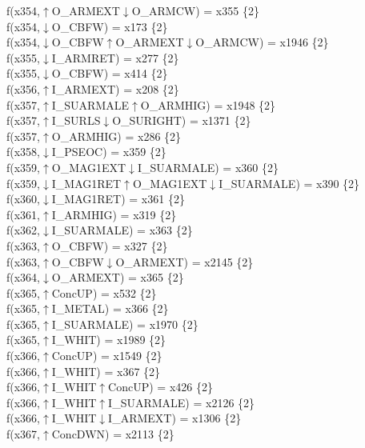 f(x354,$\uparrow$O\_ARMEXT$\downarrow$O\_ARMCW) = x355 \{2\} \\  
f(x354,$\downarrow$O\_CBFW) = x173 \{2\} \\  
f(x354,$\downarrow$O\_CBFW$\uparrow$O\_ARMEXT$\downarrow$O\_ARMCW) = x1946 \{2\} \\  
f(x355,$\downarrow$I\_ARMRET) = x277 \{2\} \\  
f(x355,$\downarrow$O\_CBFW) = x414 \{2\} \\  
f(x356,$\uparrow$I\_ARMEXT) = x208 \{2\} \\  
f(x357,$\uparrow$I\_SUARMALE$\uparrow$O\_ARMHIG) = x1948 \{2\} \\  
f(x357,$\uparrow$I\_SURLS$\downarrow$O\_SURIGHT) = x1371 \{2\} \\  
f(x357,$\uparrow$O\_ARMHIG) = x286 \{2\} \\  
f(x358,$\downarrow$I\_PSEOC) = x359 \{2\} \\  
f(x359,$\uparrow$O\_MAG1EXT$\downarrow$I\_SUARMALE) = x360 \{2\} \\  
f(x359,$\downarrow$I\_MAG1RET$\uparrow$O\_MAG1EXT$\downarrow$I\_SUARMALE) = x390 \{2\} \\  
f(x360,$\downarrow$I\_MAG1RET) = x361 \{2\} \\  
f(x361,$\uparrow$I\_ARMHIG) = x319 \{2\} \\  
f(x362,$\downarrow$I\_SUARMALE) = x363 \{2\} \\  
f(x363,$\uparrow$O\_CBFW) = x327 \{2\} \\  
f(x363,$\uparrow$O\_CBFW$\downarrow$O\_ARMEXT) = x2145 \{2\} \\  
f(x364,$\downarrow$O\_ARMEXT) = x365 \{2\} \\  
f(x365,$\uparrow$ConcUP) = x532 \{2\} \\  
f(x365,$\uparrow$I\_METAL) = x366 \{2\} \\  
f(x365,$\uparrow$I\_SUARMALE) = x1970 \{2\} \\  
f(x365,$\uparrow$I\_WHIT) = x1989 \{2\} \\  
f(x366,$\uparrow$ConcUP) = x1549 \{2\} \\  
f(x366,$\uparrow$I\_WHIT) = x367 \{2\} \\  
f(x366,$\uparrow$I\_WHIT$\uparrow$ConcUP) = x426 \{2\} \\  
f(x366,$\uparrow$I\_WHIT$\uparrow$I\_SUARMALE) = x2126 \{2\} \\  
f(x366,$\uparrow$I\_WHIT$\downarrow$I\_ARMEXT) = x1306 \{2\} \\  
f(x367,$\uparrow$ConcDWN) = x2113 \{2\} \\  
